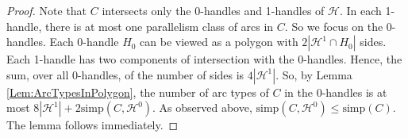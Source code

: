 \documentclass[oneside]{amsart}
\numberwithin{equation}{section}
\theoremstyle{plain}
\theoremstyle{definition}
\newcommand{\cut}{\backslash\backslash}
\newcommand{\calH}{\mathcal{H}}
\begin{document}
\begin{proof} 
Note that $C$ intersects only the 0-handles and 1-handles of $\calH$. In each 1-handle, there is at most one parallelism class of arcs in $C$. So we focus on the 0-handles.
Each 0-handle $H_0$ can be viewed as a polygon with $2|\calH^1 \cap H_0|$ sides. Each 1-handle has two components of intersection with the 0-handles. Hence, the sum, over all 0-handles, of the number of sides is $4|\calH^1|$. So, by Lemma \ref{Lem:ArcTypesInPolygon}, the number of arc types of $C$ in the 0-handles is at most $8|\calH^1| + 2 \mathrm{simp}(C,\calH^0)$. As observed above, $\mathrm{simp}(C,\calH^0) \leq \mathrm{simp}(C)$. The lemma follows immediately.
\end{proof}

\end{document}
